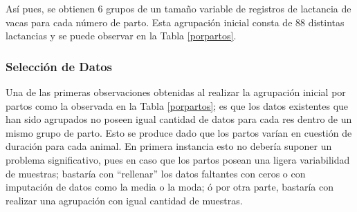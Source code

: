 \begin{table}[H]
\centering
\caption{Código de colores por número de parto}
\label{colorpartos}
\end{table}

Así pues, se obtienen 6 grupos de un tamaño variable de registros de lactancia de vacas para cada número de parto. Esta agrupación inicial consta de 88 distintas lactancias y se puede observar en la Tabla \ref{porpartos}. %

\subsubsection{Selección de Datos}

Una de las primeras observaciones obtenidas al realizar la agrupación inicial por partos como la observada en la Tabla \ref{porpartos}; es que los datos existentes que han sido agrupados no poseen igual cantidad de datos para cada res dentro de un mismo grupo de parto. Esto se produce dado que los partos varían en cuestión de duración para cada animal. En primera instancia esto no debería suponer un problema significativo, pues en caso que los partos posean una ligera variabilidad de muestras; bastaría con ``rellenar'' los datos faltantes con ceros o con imputación de datos como la media o la moda; ó por otra parte, bastaría con realizar una agrupación con igual cantidad de muestras.\\

